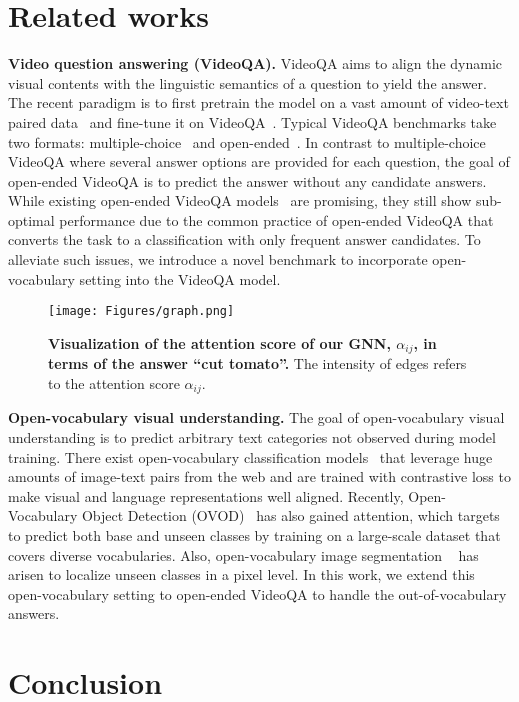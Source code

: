 \documentclass[10pt,twocolumn,letterpaper]{article}
\begin{document}
  \section{Related works}

\noindent \textbf{Video question answering (VideoQA).}
VideoQA aims to align the dynamic visual contents with the linguistic semantics of a question to yield the answer.
The recent paradigm is to first pretrain the model on a vast amount of video-text paired data~\cite{zellers2021merlot, bain2021frozen, miech2019howto100m} and fine-tune it on VideoQA~\cite{wang2022all, fu2021violet,  yang2022zero, bain2021frozen, zeng2022x, li2022align}.
Typical VideoQA benchmarks take two formats: multiple-choice~\cite{li2020hero, lei2018tvqa} and open-ended~\cite{yang2021just, jang2017tgif, xu2017video, yu2019activitynet}.
In contrast to multiple-choice VideoQA where several answer options are provided for each question, the goal of open-ended VideoQA is to predict the answer without any candidate answers.
While existing open-ended VideoQA models~\cite{lei2021less,wang2022all,li2020hero,fu2021violet,zellers2021merlot,le2020hierarchical,yang2022zero} are promising, they still show sub-optimal performance due to the common practice of open-ended VideoQA that converts the task to a classification with only frequent answer candidates.
To alleviate such issues, we introduce a novel benchmark to incorporate open-vocabulary setting into the VideoQA model.

\begin{figure}[t]
    \vspace{-1mm}
    \centering
    \texttt{[image: Figures/graph.png]}
    \caption{\textbf{Visualization of the attention score of our GNN, $\alpha_{ij}$, in terms of the answer ``cut tomato''.}
    The intensity of edges refers to the attention score $\alpha_{ij}$.
    }
    \vspace{-1mm}
    \label{fig:graph}
\end{figure} \noindent \textbf{Open-vocabulary visual understanding.}
The goal of open-vocabulary visual understanding is to predict arbitrary text categories not observed during model training.
There exist open-vocabulary classification models~\cite{radford2021learning, jia2021scaling} that leverage huge amounts of image-text pairs from the web and are trained with contrastive loss to make visual and language representations well aligned.
Recently, Open-Vocabulary Object Detection (OVOD)~\cite{zareian2021open,minderer2022simple,gu2021open, zhong2022regionclip, du2022learning, zhou2022detecting} has also gained attention, which targets to predict both base and unseen classes by training on a large-scale dataset that covers diverse vocabularies.
Also, open-vocabulary image segmentation ~\cite{huynh2022open,zhou2022maskclip,zhao2017open,xu2022simple,liang2022open,bucher2019zero,li2022language,ghiasi2022scaling,ding2022open} has arisen to localize unseen classes in a pixel level.
In this work, we extend this open-vocabulary setting to open-ended VideoQA to handle the out-of-vocabulary answers. \section{Conclusion}
\end{document}
